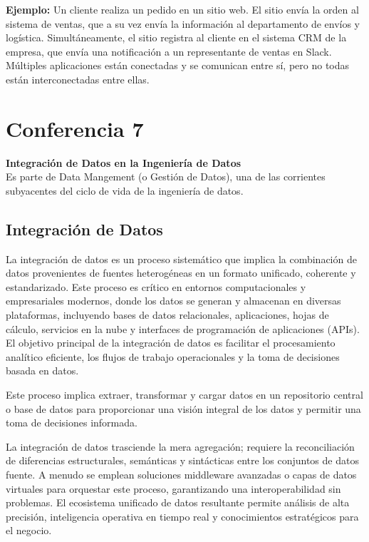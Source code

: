 \documentclass[12pt]{book}
\begin{document}
\textbf{Ejemplo:} Un cliente realiza un pedido en un sitio web. El sitio envía la orden al sistema de ventas, que a su vez envía la información al departamento de envíos y logística. Simultáneamente, el sitio registra al cliente en el sistema CRM de la empresa, que envía una notificación a un representante de ventas en Slack. Múltiples aplicaciones están conectadas y se comunican entre sí, pero no todas están interconectadas entre ellas.

\chapter{Conferencia 7}
\normalfont\LARGE \textbf{Integración de Datos en la Ingeniería de Datos}
\normalfont\small\\
Es parte de Data Mangement (o Gestión de Datos), una de las corrientes subyacentes del ciclo de vida de la ingeniería de datos.
\section{Integración de Datos}
La integración de datos es un proceso sistemático que implica la combinación de datos provenientes de fuentes heterogéneas 
en un formato unificado, coherente y estandarizado. Este proceso es crítico en entornos computacionales y empresariales modernos, 
donde los datos se generan y almacenan en diversas plataformas, incluyendo bases de datos relacionales, aplicaciones, hojas de cálculo, 
servicios en la nube y interfaces de programación de aplicaciones (APIs). El objetivo principal de la integración de datos es facilitar 
el procesamiento analítico eficiente, los flujos de trabajo operacionales y la toma de decisiones basada en datos.

Este proceso implica extraer, transformar y cargar datos en un repositorio central o base de datos para proporcionar 
una visión integral de los datos y permitir una toma de decisiones informada.

La integración de datos trasciende la mera agregación; requiere la reconciliación de diferencias estructurales, semánticas y sintácticas entre los conjuntos de datos fuente. A menudo se emplean soluciones middleware avanzadas o capas de datos virtuales para orquestar este proceso, garantizando una interoperabilidad sin problemas. El ecosistema unificado de datos resultante permite análisis de alta precisión, inteligencia operativa en tiempo real y conocimientos estratégicos para el negocio.
\end{document}
